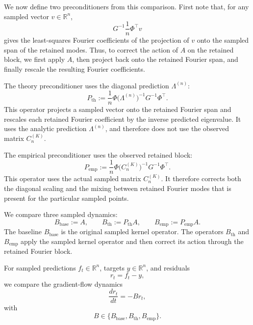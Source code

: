 We now define two preconditioners from this comparison. First note that, for any
sampled vector \(v\in\mathbb R^n\),
\[
	G^{-1}\frac1n\Phi^\top v
\]
gives the least-squares Fourier coefficients of the projection of \(v\) onto
the sampled span of the retained modes. Thus, to correct the action of \(A\) on
the retained block, we first apply \(A\), then project back onto the retained
Fourier span, and finally rescale the resulting Fourier coefficients.

The theory preconditioner uses the diagonal prediction \(\Lambda^{(n)}\):
\begin{equation}
	P_{\mathrm{th}}
	:=
	\frac1n
	\Phi
	\bigl(\Lambda^{(n)}\bigr)^{-1}
	G^{-1}
	\Phi^\top .
	\label{eq:method-theory-preconditioner}
\end{equation}
This operator projects a sampled vector onto the retained Fourier span and
rescales each retained Fourier coefficient by the inverse predicted eigenvalue.
It uses the analytic prediction \(\Lambda^{(n)}\), and therefore does not use
the observed matrix \(C_n^{(K)}\).

The empirical preconditioner uses the observed retained block:
\begin{equation}
	P_{\mathrm{emp}}
	:=
	\frac1n
	\Phi
	\bigl(C_n^{(K)}\bigr)^{-1}
	G^{-1}
	\Phi^\top .
	\label{eq:method-empirical-preconditioner}
\end{equation}
This operator uses the actual sampled matrix \(C_n^{(K)}\). It therefore
corrects both the diagonal scaling and the mixing between retained Fourier modes
that is present for the particular sampled points.

We compare three sampled dynamics:
\begin{equation}
	B_{\mathrm{base}}:=A,
	\qquad
	B_{\mathrm{th}}:=P_{\mathrm{th}}A,
	\qquad
	B_{\mathrm{emp}}:=P_{\mathrm{emp}}A.
	\label{eq:method-preconditioned-operators}
\end{equation}
The baseline \(B_{\mathrm{base}}\) is the original sampled kernel operator. The
operators \(B_{\mathrm{th}}\) and \(B_{\mathrm{emp}}\) apply the sampled kernel
operator and then correct its action through the retained Fourier block.

For sampled predictions \(f_t\in\mathbb R^n\), targets \(y\in\mathbb R^n\), and
residuals
\[
	r_t=f_t-y,
\]
we compare the gradient-flow dynamics
\begin{equation}
	\frac{d r_t}{dt}
	=
	- B r_t,
	\label{eq:method-sampled-operator-flow}
\end{equation}
with
\[
	B\in\{B_{\mathrm{base}},B_{\mathrm{th}},B_{\mathrm{emp}}\}.
\]

